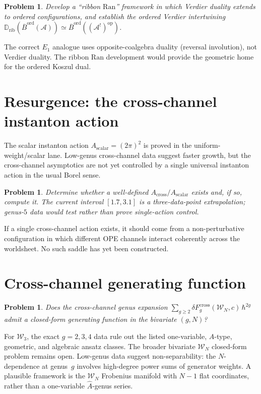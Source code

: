 \documentclass[11pt]{amsart}
\newcommand{\cA}{\mathcal{A}}
\newcommand{\cW}{\mathcal{W}}
\newcommand{\barB}{\overline{B}}
\newcommand{\Ran}{\mathrm{Ran}}
\theoremstyle{plain}
\newtheorem{problem}[theorem]{Problem}
\theoremstyle{definition}
\theoremstyle{remark}
\begin{document}
\begin{problem}
Develop a ``ribbon $\Ran$'' framework in which Verdier duality
extends to ordered configurations, and establish the ordered
Verdier intertwining
$\mathbb{D}_{\mathrm{rib}}(\barB^{\mathrm{ord}}(\cA))
\simeq \barB^{\mathrm{ord}}((\cA^!)^{\mathrm{op}})$.
\end{problem}

The correct $E_1$ analogue uses opposite-coalgebra duality
(reversal involution), not Verdier duality. The ribbon $\Ran$
development would provide the geometric home for the ordered
Koszul dual.


\section{Resurgence: the cross-channel instanton action}

The scalar instanton action $A_{\mathrm{scalar}} = (2\pi)^2$ is
proved in the uniform-weight/scalar lane.  Low-genus cross-channel
data suggest faster growth, but the cross-channel asymptotics are
not yet controlled by a single universal instanton action in the
usual Borel sense.

\begin{problem}
Determine whether a well-defined
$A_{\mathrm{cross}}/A_{\mathrm{scalar}}$ exists and, if so, compute
it.  The current interval $[1.7, 3.1]$ is a three-data-point
extrapolation; genus-$5$ data would test rather than prove
single-action control.
\end{problem}

If a single cross-channel action exists, it should come from a
non-perturbative configuration in which different OPE channels
interact coherently across the worldsheet.  No such saddle has yet
been constructed.


\section{Cross-channel generating function}

\begin{problem}
Does the cross-channel genus expansion
$\sum_{g \geq 2} \delta F_g^{\mathrm{cross}}(\cW_N, c)\,
\hbar^{2g}$ admit a closed-form generating function in the
bivariate $(g, N)$?
\end{problem}

For $\cW_3$, the exact $g=2,3,4$ data rule out the listed
one-variable, $\hat A$-type, geometric, and algebraic ansatz
classes.  The broader bivariate $\cW_N$ closed-form problem remains
open.  Low-genus data
suggest non-separability: the $N$-dependence at genus~$g$ involves
high-degree power sums of generator weights. A plausible framework
is the $\cW_N$ Frobenius manifold with $N{-}1$ flat coordinates,
rather than a one-variable $\hat{A}$-genus series.
\end{document}
